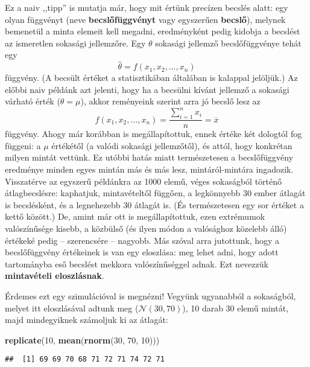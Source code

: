 \documentclass[]{book}
\newenvironment{Shaded}{\begin{snugshade}}{\end{snugshade}}
\newcommand{\DecValTok}[1]{\textcolor[rgb]{0.00,0.00,0.81}{#1}}
\newcommand{\KeywordTok}[1]{\textcolor[rgb]{0.13,0.29,0.53}{\textbf{#1}}}
\newcommand{\NormalTok}[1]{#1}
\begin{document}
Ez a naiv ,,tipp'' is mutatja már, hogy mit értünk precízen becslés alatt: egy olyan függvényt (neve \textbf{becslőfüggvényt} vagy egyszerűen \textbf{becslő}), melynek bemenetül a minta elemeit kell megadni, eredményként pedig kidobja a becslést az ismeretlen sokasági jellemzőre. Egy \(\theta\) sokasági jellemző becslőfüggvénye tehát egy
\[
    \widehat{\theta} = f\left(x_1,x_2,\ldots,x_n\right)
\]
függvény. (A becsült értéket a statisztikában általában is kalappal jelöljük.) Az előbbi naiv példánk azt jelenti, hogy ha a becsülni kívánt jellemző a sokasági várható érték (\(\theta=\mu\)), akkor reményeink szerint arra jó becslő lesz az
\[
    f\left(x_1,x_2,\ldots,x_n\right)=\frac{\sum_{i=1}^n x_i}{n}=\overline{x}
\]
függvény. Ahogy már korábban is megállapítottuk, ennek értéke két dologtól fog függeni: a \(\mu\) értékétől (a valódi sokasági jellemzőtől), és attól, hogy konkrétan milyen mintát vettünk. Ez utóbbi hatás miatt természetesen a becslőfüggvény eredménye minden egyes mintán más és más lesz, mintáról-mintára ingadozik. Visszatérve az egyszerű példánkra az 1000 elemű, véges sokaságból történő átlagbecslésre: kaphatjuk, mintavételtől függően, a legkönnyebb 30 ember átlagát is becslésként, és a legnehezebb 30 átlagát is. (És természetesen egy sor értéket a kettő között.) De, amint már ott is megállapítottuk, ezen extrémumok valószínűsége kisebb, a közbülső (és ilyen módon a valósághoz közelebb álló) értékeké pedig -- szerencsére -- nagyobb. Más szóval arra jutottunk, hogy a becslőfüggvény értékeinek is van egy eloszlása: meg lehet adni, hogy adott tartományba eső becslést mekkora valószínűséggel adnak. Ezt nevezzük \textbf{mintavételi eloszlásnak}.

Érdemes ezt egy szimulációval is megnézni! Vegyünk ugyanabból a sokaságból, melyet itt eloszlásával adtunk meg (\(\mathcal{N}\left(30,70\right)\)), 10 darab 30 elemű mintát, majd mindegyiknek számoljuk ki az átlagát:

\begin{Shaded}
\begin{Highlighting}[]
\KeywordTok{replicate}\NormalTok{(}\DecValTok{10}\NormalTok{, }\KeywordTok{mean}\NormalTok{(}\KeywordTok{rnorm}\NormalTok{(}\DecValTok{30}\NormalTok{, }\DecValTok{70}\NormalTok{, }\DecValTok{10}\NormalTok{)))}
\end{Highlighting}
\end{Shaded}

\begin{verbatim}
##  [1] 69 69 70 68 71 72 71 74 72 71
\end{verbatim}
\end{document}

